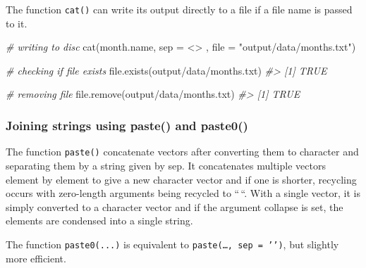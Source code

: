 \documentclass[
]{book}
\newenvironment{Shaded}{\begin{snugshade}}{\end{snugshade}}
\newcommand{\AttributeTok}[1]{\textcolor[rgb]{0.77,0.63,0.00}{#1}}
\newcommand{\CommentTok}[1]{\textcolor[rgb]{0.56,0.35,0.01}{\textit{#1}}}
\newcommand{\FunctionTok}[1]{\textcolor[rgb]{0.00,0.00,0.00}{#1}}
\newcommand{\NormalTok}[1]{#1}
\newcommand{\StringTok}[1]{\textcolor[rgb]{0.31,0.60,0.02}{#1}}
\begin{document}
The function \texttt{cat()} can write its output directly to a file if a file name is passed to it.

\begin{Shaded}
\begin{Highlighting}[]
\CommentTok{\# writing to disc}
\FunctionTok{cat}\NormalTok{(month.name, }\AttributeTok{sep =} \StringTok{\textquotesingle{} \textless{}\textgreater{} \textquotesingle{}}\NormalTok{, }\AttributeTok{file =} \StringTok{"output/data/months.txt"}\NormalTok{)}

\CommentTok{\# checking if file exists}
\FunctionTok{file.exists}\NormalTok{(}\StringTok{\textquotesingle{}output/data/months.txt\textquotesingle{}}\NormalTok{)}
\CommentTok{\#\textgreater{} [1] TRUE}

\CommentTok{\# removing file}
\FunctionTok{file.remove}\NormalTok{(}\StringTok{\textquotesingle{}output/data/months.txt\textquotesingle{}}\NormalTok{)}
\CommentTok{\#\textgreater{} [1] TRUE}
\end{Highlighting}
\end{Shaded}

\hypertarget{joining-strings-using-paste-and-paste0}{%
\subsubsection{Joining strings using paste() and paste0()}\label{joining-strings-using-paste-and-paste0}}

The function \texttt{paste()} concatenate vectors after converting them to character and separating them by a string given by sep. It concatenates multiple vectors element by element to give a new character vector and if one is shorter, recycling occurs with zero-length arguments being recycled to ``\,``.
With a single vector, it is simply converted to a character vector and if the argument collapse is set, the elements are condensed into a single string.

The function \texttt{paste0(...)} is equivalent to \texttt{paste(\ldots{},\ sep\ =\ ’’)}, but slightly more efficient.
\end{document}
